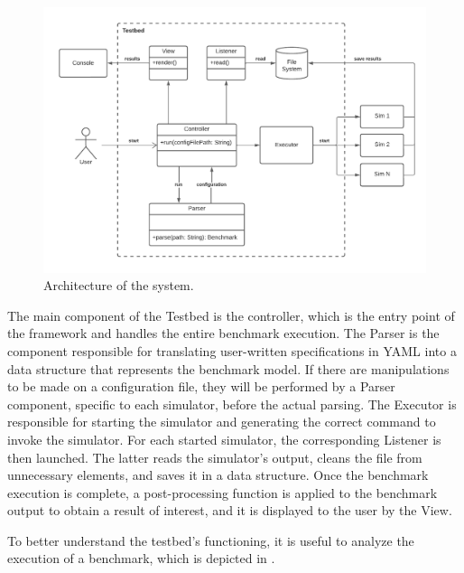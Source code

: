 \documentclass[12pt,a4paper,openright,twoside]{book}
\begin{document}
\begin{figure}[h!]
  \centering
  \includegraphics[width=\textwidth]{figures/testbed-architecture.pdf}
  \caption{Architecture of the system.}
  \label{fig:detailed-architecture}
\end{figure}

The main component of the Testbed is the controller, which is the entry point of the framework and handles the entire benchmark execution.
The Parser is the component responsible for translating user-written specifications in YAML into a data structure that represents the benchmark model.
If there are manipulations to be made on a configuration file, they will be performed by a Parser component, specific to each simulator, before the actual parsing.
The Executor is responsible for starting the simulator and generating the correct command to invoke the simulator.
For each started simulator, the corresponding Listener is then launched. 
The latter reads the simulator's output, cleans the file from unnecessary elements, and saves it in a data structure.
Once the benchmark execution is complete, a post-processing function is applied to the benchmark output to obtain a result of interest, and it is displayed to the user by the View.

To better understand the testbed's functioning, it is useful to analyze the execution of a benchmark, which is depicted in .
\end{document}
